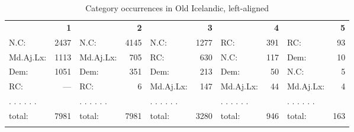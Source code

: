\documentclass[output=paper,colorlinks,citecolor=brown,draft]{langscibook}
\begin{document}
\begin{table}
\caption{Category occurrences in Old Icelandic, left-aligned }
\label{tab:prob1} \small 
%
%
%

  \begin{tabularx}{\textwidth}{X@{}r X@{}r X@{}r X@{}r X@{}r }
  \lsptoprule

    &\textbf{1} && \textbf{2} && \textbf{3} && \textbf{4} &&\textbf{5} \\
    \cmidrule(lr){1-2}\cmidrule(lr){3-4}\cmidrule(lr){5-6}\cmidrule(lr){7-8}\cmidrule(lr){9-10}
    N.C:&  2437       &  N.C:&  4145    &   N.C:&  1277   &  RC:&  391      &  RC:&  93     \\
    Md.Aj.Lx:&  1113  & Md.Aj.Lx:& \hspace{0.15mm}705 &   RC:&  630     & N.C:&  117      & Dem:&  10  \\
    Dem:&  1051       &  Dem:&  351     &  Dem:&  213     &   Dem:&  50     &  N.C:&  5      \\
    RC:&  ---         &  RC:&  6        & Md.Aj.Lx:& \hspace{0.15mm}147 & Md.Aj.Lx:& \hspace{0.15mm}44  & Md.Aj.Lx:&  4 \\
    . .	. . . .     && . . . . . .	&& . . . . . .   &&. . . . . .	&& . . . . . .	 	\\
    \cmidrule(lr){1-2}\cmidrule(lr){3-4}\cmidrule(lr){5-6}\cmidrule(lr){7-8}\cmidrule(lr){9-10}
    total:&  7981     &  total:&  7981  &  total:&  3280  & total:&  946    &  total:&  163     \\

   \lspbottomrule
 \end{tabularx}
\end{table} 
\end{document}
